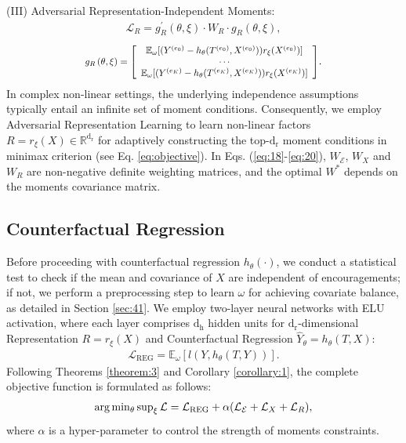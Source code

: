 \documentclass[journal]{IEEEtran}
\newcommand*{\Scale}[2][4]{\scalebox{#1}{$#2$}}
\begin{document}
(III) Adversarial Representation-Independent Moments:
\begin{eqnarray} \label{eq:20}
\mathcal{L}_{R} =  g_R^\prime\left(\theta, \xi\right) \cdot W_R \cdot g_R\left(\theta, \xi\right),
\end{eqnarray}
\vspace{-16pt}
\begin{eqnarray}
\Scale[0.85]{
g_R\left(\theta, \xi\right)=\left[\begin{array}{c}
\mathbb{E}_{\omega}[({Y}^{(e_0)} - h_{\theta}( T^{(e_0)}, X^{(e_0)})) r_\xi({X}^{(e_0)})] \\
\cdots \\
\mathbb{E}_{\omega}[({Y}^{(e_K)} - h_{\theta}( T^{(e_K)}, X^{(e_K)}))r_\xi({X}^{(e_K)})]
\end{array}\right]
}.
\nonumber
\end{eqnarray}
In complex non-linear settings, the underlying independence assumptions typically entail an infinite set of moment conditions. Consequently, we employ Adversarial Representation Learning to learn non-linear factors $R = r_{\xi}(X) \in \mathbb{R}^{\text{d}_\text{r}}$ for adaptively constructing the top-$\text{d}_\text{r}$ moment conditions in minimax criterion (see Eq. \eqref{eq:objective}). In Eqs. (\ref{eq:18}-\ref{eq:20}), $W_{\mathcal{E}}$, $W_X$ and $W_R$ are non-negative definite weighting matrices, and the optimal $W^\ast$ depends on the moments covariance matrix.


\subsection{Counterfactual Regression} \label{sec:regression}
Before proceeding with counterfactual regression $h_\theta(\cdot)$, we conduct a statistical test to check if the mean and covariance of $X$ are independent of encouragements; if not, we perform a preprocessing step to learn $\omega$ for achieving covariate balance, as detailed in Section \ref{sec:41}.
We employ two-layer neural networks with ELU activation, where each layer comprises $\text{d}_\text{h}$ hidden units for $\text{d}_\text{r}$-dimensional Representation $R=r_\xi(X)$ and Counterfactual Regression $\hat{Y}_\theta=h_\theta(T,X)$:
\begin{eqnarray}
\mathcal{L}_{\text{REG}} =  \mathbb{E}_{\omega}[l(Y,h_{\theta}(T, Y))].
\end{eqnarray}
Following Theorems \ref{theorem:3} and Corollary \ref{corollary:1}, the complete objective function is formulated as follows: 
\begin{eqnarray} \label{eq:objective}
\Scale[1.0]{
\arg\min_{{\theta}} \sup_{{\xi}}
\mathcal{L} = \mathcal{L}_{\text{REG}} 
+ \alpha (\mathcal{L}_{\mathcal{E}}
+ \mathcal{L}_{X} 
+ \mathcal{L}_{R}) 
},
\end{eqnarray}
where $\alpha$ is a hyper-parameter to control the strength of moments constraints. 
\end{document}
